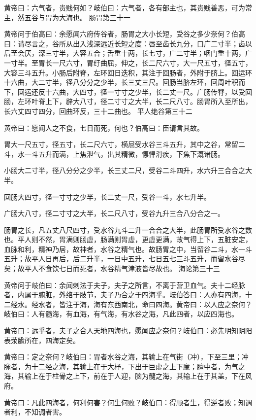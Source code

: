 \documentclass[a4paper,12pt,UTF8,twoside]{ctexbook}
\begin{document}
	黄帝曰：六气者，贵贱何如？岐伯曰：六气者，各有部主也，其贵贱善恶，可为常主，然五谷与胃为大海也。
	肠胃第三十一
	
	黄帝问于伯高曰：余愿闻六府传谷者，肠胃之大小长短，受谷之多少奈何？伯高曰：请尽言之，谷所从出入浅深远近长短之度：唇至齿长九分，口广二寸半；齿以后至会厌，深三寸半，大容五合；舌重十两，长七寸，广二寸半；咽门重十两，广一寸半。至胃长一尺六寸，胃纡曲屈，伸之，长二尺六寸，大一尺五寸，径五寸，大容三斗五升。小肠后附脊，左环回日迭积，其注于回肠者，外附于脐上。回运环十六曲，大二寸半，径八分分之少半，长三丈三尺。回肠当脐左环，回周叶积而下，回运还反十六曲，大四寸，径一寸寸之少半，长二丈一尺。广肠传脊，以受回肠，左环叶脊上下，辟大八寸，径二寸寸之大半，长二尺八寸。肠胃所入至所出，长六丈四寸四分，回曲环反，三十二曲也。
	平人绝谷第三十二
	
	黄帝曰：愿闻人之不食，七日而死，何也？伯高曰：臣请言其故。
	
	胃大一尺五寸，径五寸，长二尺六寸，横屈受水谷三斗五升，其中之谷，常留二斗，水一斗五升而满，上焦泄气，出其精微，慓悍滑疾，下焦下溉诸肠。
	
	小肠大二寸半，径八分分之少半，长三丈二尺，受谷二斗四升，水六升三合合之大半。
	
	回肠大四寸，径一寸寸之少半，长二丈一尺，受谷一斗，水七升半。
	
	广肠大八寸，径二寸寸之大半，长二尺八寸，受谷九升三合八分合之一。
	
	肠胃之长，凡五丈八尺四寸，受水谷九斗二升一合合之大半，此肠胃所受水谷之数也。平人则不然，胃满则肠虚，肠满则胃虚，更虚更满，故气得上下，五脏安定，血脉和利，精神乃居，故神者，水谷之精气也。故肠胃之中，当留谷二斗，水一斗五升；故平人日再后，后二升半，一日中五升，七日五七三斗五升，而留水谷尽矣；故平人不食饮七日而死者，水谷精气津液皆尽故也。
	海论第三十三
	
	黄帝问于岐伯曰：余闻刺法于夫子，夫子之所言，不离于营卫血气。夫十二经脉者，内属于腑脏，外络于肢节，夫子乃合之于四海乎。岐伯答曰：人亦有四海，十二经水。经水者，皆注于海，海有东西南北，命曰四海。黄帝曰：以人应之奈何？岐伯曰：人有髓海，有血海，有气海，有水谷之海，凡此四者，以应四海也。
	
	黄帝曰：远乎者，夫子之合人天地四海也，愿闻应之奈何？岐伯曰：必先明知阴阳表荥腧所在，四海定矣。
	
	黄帝曰：定之奈何？岐伯曰：胃者水谷之海，其输上在气街（冲），下至三里；冲脉者，为十二经之海，其输上在于大杼，下出于巨虚之上下廉；膻中者，为气之海，其输上在于柱骨之上下，前在于人迎，脑为髓之海，其输上在于其盖，下在风府。
	
	黄帝曰：凡此四海者，何利何害？何生何败？岐伯曰：得顺者生，得逆者败；知调者利，不知调者害。
	
\end{document}
